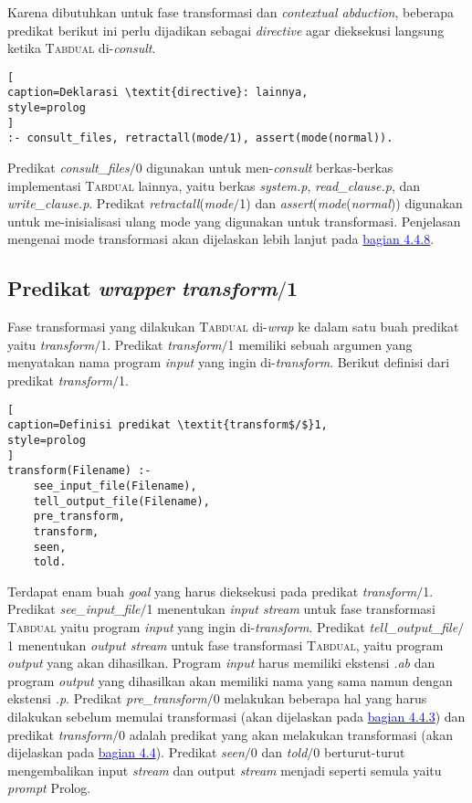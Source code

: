 Karena dibutuhkan untuk fase transformasi dan \textit{contextual abduction}, beberapa predikat berikut ini perlu dijadikan sebagai \textit{directive} agar dieksekusi langsung ketika \textsc{Tabdual} di-\textit{consult}.
\\

\begin{lstlisting}[
caption=Deklarasi \textit{directive}: lainnya,
style=prolog
]
:- consult_files, retractall(mode/1), assert(mode(normal)).
\end{lstlisting}

Predikat \textit{consult\_files$/$}0 digunakan untuk men-\textit{consult} berkas-berkas implementasi \textsc{Tabdual} lainnya, yaitu berkas \textit{system.p}, \textit{read\_clause.p}, dan \textit{write\_clause.p}. Predikat \textit{retractall}(\textit{mode$/$}1) dan \textit{assert}(\textit{mode}(\textit{normal})) digunakan untuk me-inisialisasi ulang mode yang digunakan untuk transformasi. Penjelasan mengenai mode transformasi akan dijelaskan lebih lanjut pada \hyperref[subsec:mode]{\textcolor{blue}{bagian 4.4.8}}.

\subsection{Predikat \textit{wrapper} \textit{transform$/$}1}

Fase transformasi yang dilakukan \textsc{Tabdual} di-\textit{wrap} ke dalam satu buah predikat yaitu \textit{transform$/$}1. Predikat \textit{transform$/$}1 memiliki sebuah argumen yang menyatakan nama program \textit{input} yang ingin di-\textit{transform}. Berikut definisi dari predikat \textit{transform$/$}1.
\\

\begin{lstlisting}[
caption=Definisi predikat \textit{transform$/$}1,
style=prolog
]
transform(Filename) :-
	see_input_file(Filename),
	tell_output_file(Filename),
	pre_transform,
	transform,
	seen,
	told.
\end{lstlisting}

Terdapat enam buah \textit{goal} yang harus dieksekusi pada predikat \textit{transform$/$}1. Predikat \textit{see\_input\_file$/$}1 menentukan \textit{input stream} untuk fase transformasi \textsc{Tabdual} yaitu program \textit{input} yang ingin di-\textit{transform}. Predikat \textit{tell\_output\_file$/$}1 menentukan \textit{output stream} untuk fase transformasi \textsc{Tabdual}, yaitu program \textit{output} yang akan dihasilkan. Program \textit{input} harus memiliki ekstensi \textit{.ab} dan program \textit{output} yang dihasilkan akan memiliki nama yang sama namun dengan ekstensi \textit{.p}. Predikat \textit{pre\_transform$/$}0 melakukan beberapa hal yang harus dilakukan sebelum memulai transformasi (akan dijelaskan pada \hyperref[subsec:pre_transform]{\textcolor{blue}{bagian 4.4.3}}) dan predikat \textit{transform$/$}0 adalah predikat yang akan melakukan  transformasi (akan dijelaskan pada \hyperref[transform]{\textcolor{blue}{bagian 4.4}}). Predikat \textit{seen$/$}0 dan \textit{told$/$}0 berturut-turut mengembalikan input \textit{stream} dan output \textit{stream} menjadi seperti semula yaitu \textit{prompt} Prolog.

